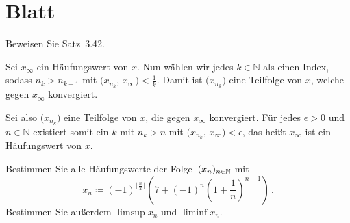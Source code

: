 \section{Blatt}

\begin{aufg}[6 Punkte]
Beweisen Sie Satz~3.42.
\end{aufg}

\bigskip

\begin{lsg} 
Sei \(x_{\infty}\) ein Häufungswert von $x$. Nun wählen wir jedes $k\in\mathbb{N}$ als einen Index, sodass \(n_{k}\)$>$\(n_{k-1}\) mit $($\(x_{n_{k}}\), \(x_{\infty}\)$)$$<$\(\frac{1}{k}\). Damit ist $($\(x_{n_{k}}\)$)$ eine Teilfolge von $x$, welche gegen \(x_{\infty}\) konvergiert.

Sei also $($\(x_{n_{k}}\)$)$ eine Teilfolge von $x$, die gegen \(x_{\infty}\) konvergiert. Für jedes $\epsilon > 0$ und  $n\in\mathbb{N}$ existiert somit ein $k$ mit \(n_{k}\)$>n$ mit  $($\(x_{n_{k}}\), \(x_{\infty}\)$)$$< \epsilon$, das heißt \(x_{\infty}\) ist ein Häufungswert von $x$.
\end{lsg}

\bigskip


\begin{aufg}[6 Punkte]
Bestimmen Sie alle H\"aufungswerte der Folge~$(x_n)_{n\in\mathbb{N}}$ mit 
\[
 x_n \coloneqq (-1)^{\lfloor \frac{n}{2}\rfloor} \left( 7 + (-1)^n\left(1+\frac1n\right)^{n+1} \right)\,. 
\]
Bestimmen Sie au{\ss}erdem $\limsup x_n$ und $\liminf x_n$.
\end{aufg}

\bigskip

